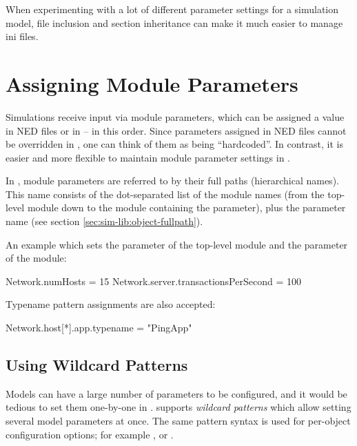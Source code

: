 When experimenting with a lot of different parameter settings for a
simulation model, file inclusion and section inheritance can make it much
easier to manage ini files.


\section{Assigning Module Parameters}
\label{sec:config-sim:parameter-settings}

Simulations receive input via module parameters, which can be assigned a
value in NED files or in  -- in this order. Since parameters
assigned in NED files cannot be overridden in , one can
think of them as being ``hardcoded''. In contrast, it is easier
and more flexible to maintain module parameter settings in .

In , module parameters are referred to by their full paths
(hierarchical names). This name consists of the dot-separated list of
the module names (from the top-level module down to the module containing
the parameter), plus the parameter name (see section \ref{sec:sim-lib:object-fullpath}).

An example  which sets the  parameter of
the top-level module and the  parameter of the
 module:

\begin{inifile}
[General]
Network.numHosts = 15
Network.server.transactionsPerSecond = 100
\end{inifile}

Typename pattern assignments are also accepted:

\begin{inifile}
[General]
Network.host[*].app.typename = "PingApp"
\end{inifile}


\subsection{Using Wildcard Patterns}
\label{sec:config-sim:wildcards}

Models can have a large number of parameters to be configured, and it would
be tedious to set them one-by-one in . {\opp} supports
\textit{wildcard patterns} which allow setting several model parameters
at once. The same pattern syntax is used for per-object configuration options;
for example , or .

